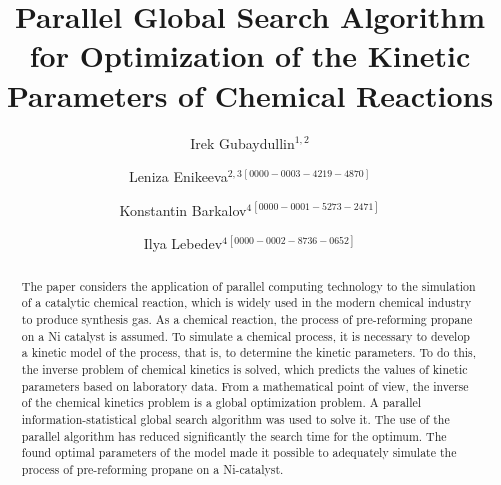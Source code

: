 \documentclass{svproc}
\def\orcidID#1{\unskip$^{[#1]}$}
\begin{document}
\mainmatter              %
%
\title{Parallel Global Search Algorithm for Optimization of the Kinetic Parameters of Chemical Reactions}
%
%
\author{
Irek Gubaydullin$^{1,2}$\and
Leniza Enikeeva$^{2,3}$\orcidID{0000-0003-4219-4870}
\and
Konstantin Barkalov$^4$\orcidID{0000-0001-5273-2471}
\and
Ilya Lebedev$^4$\orcidID{0000-0002-8736-0652} 
}

%
%
%


	
\maketitle              %

\begin{abstract}
The paper considers the application of parallel computing technology to the simulation of a catalytic chemical reaction, which is widely used in the modern chemical industry to produce synthesis gas. As a chemical reaction, the process of pre-reforming propane on a Ni catalyst is assumed. To simulate a chemical process, it is necessary to develop a kinetic model of the process, that is, to determine the kinetic parameters. To do this, the inverse problem of chemical kinetics is solved, which predicts the values of kinetic parameters based on laboratory data. From a mathematical point of view, the inverse of the chemical kinetics problem is a global optimization problem. A parallel information-statistical global search algorithm was used to solve it. The use of the parallel algorithm has reduced significantly the search time for the optimum. The found optimal parameters of the model made it possible to adequately simulate the process of pre-reforming propane on a Ni-catalyst.

\end{abstract}
\end{document}
